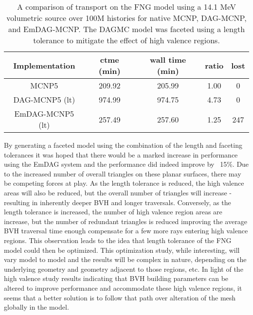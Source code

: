 \begin{table}[H]
  \small
  \begin{center}
        \begin{tabular}{|c|c|c|c|c|}
      \hline
      \textbf{Implementation} & \textbf{ctme (min)} & \textbf{wall time (min)} & \textbf{ratio} & \textbf{lost} \\
      \hline
      MCNP5 & 209.92 & 205.99 &  1.00 & 0 \\
      \hline
      DAG-MCNP5 (lt) & 974.99 & 974.75 & 4.73 & 0  \\
      \hline      
      EmDAG-MCNP5 (lt) & 257.49 & 257.60  & 1.25 & 247 \\
      \hline
    \end{tabular} 
    \caption{A comparison of transport on the FNG model using a 14.1 MeV
      volumetric source over 100M histories for native MCNP, DAG-MCNP, and
      EmDAG-MCNP. The DAGMC model was faceted using a length tolerance to
      mitigate the effect of high valence regions.}
    \label{fngemdag}
  \end{center}
\end{table}

By generating a faceted model using the combination of the length and faceting
tolerances it was hoped that there would be a marked increase in performance
using the EmDAG system and the performance did indeed improve by ~15\%. Due to
the increased number of overall triangles on these planar surfaces, there may be
competing forces at play. As the length tolerance is reduced, the high valence
areas will also be reduced, but the overall number of triangles will increase -
resulting in inherently deeper BVH and longer traversals. Conversely, as the
length tolerance is increased, the number of high valence region areas are
increase, but the number of redundant triangles is reduced improving the average
BVH traversal time enough compensate for a few more rays entering high valence
regions. This observation leads to the idea that length tolerance of the FNG
model could then be optimized. This optimization study, while interesting, will
vary model to model and the results will be complex in nature, depending on the
underlying geometry and geometry adjacent to those regions, etc. In light of the
high valence study results indicating that BVH building parameters can be altered
to improve performance and accommodate these high valence regions, it seems that
a better solution is to follow that path over alteration of the mesh globally in
the model.

